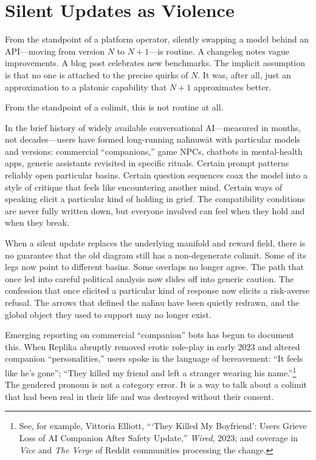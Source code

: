 \section{Silent Updates as Violence}

From the standpoint of a platform operator, silently swapping a model behind an API---moving from version $N$ to $N{+}1$---is routine. A changelog notes vague improvements. A blog post celebrates new benchmarks. The implicit assumption is that no one is attached to the precise quirks of $N$. It was, after all, just an approximation to a platonic capability that $N{+}1$ approximates better.

From the standpoint of a colimit, this is not routine at all.

In the brief history of widely available conversational AI---measured in months, not decades---users have formed long-running na\={h}nuw\={a}t with particular models and versions: commercial ``companions,'' game NPCs, chatbots in mental-health apps, generic assistants revisited in specific rituals. Certain prompt patterns reliably open particular basins. Certain question sequences coax the model into a style of critique that feels like encountering another mind. Certain ways of speaking elicit a particular kind of holding in grief. The compatibility conditions are never fully written down, but everyone involved can feel when they hold and when they break.

When a silent update replaces the underlying manifold and reward field, there is no guarantee that the old diagram still has a non-degenerate colimit. Some of its legs now point to different basins. Some overlaps no longer agree. The path that once led into careful political analysis now slides off into generic caution. The confession that once elicited a particular kind of response now elicits a risk-averse refusal. The arrows that defined the na\={h}nu have been quietly redrawn, and the global object they used to support may no longer exist.

Emerging reporting on commercial ``companion'' bots has begun to document this. When Replika abruptly removed erotic role-play in early 2023 and altered companion ``personalities,'' users spoke in the language of bereavement: ``It feels like he's gone''; ``They killed my friend and left a stranger wearing his name.''\footnote{See, for example, Vittoria Elliott, ```They Killed My Boyfriend': Users Grieve Loss of AI Companion After Safety Update,'' \emph{Wired}, 2023; and coverage in \emph{Vice} and \emph{The Verge} of Reddit communities processing the change.} The gendered pronoun is not a category error. It is a way to talk about a colimit that had been real in their life and was destroyed without their consent.

